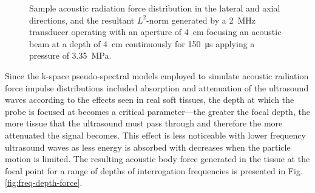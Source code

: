 \begin{figure}[!htb]
				\caption[Sample acoustic radiation force distribution]{Sample acoustic radiation force distribution in the \protect{} lateral and \protect{} axial directions, and \protect{} the resultant $L^2$-norm generated by a \SI{2}{\MHz} transducer operating with an aperture of \SI{4}{cm} focusing an acoustic beam at a depth of \SI{4}{\cm} continuously for \SI{150}{\us} applying a pressure of \SI{3.35}{\MPa}.}
				\label{fig:arfi_forces}
			\end{figure}

			Since the k-space pseudo-spectral models employed to simulate acoustic radiation force impulse distributions included absorption and attenuation of the ultrasound waves according to the effects seen in real soft tissues, the depth at which the probe is focused at becomes a critical parameter---the greater the focal depth, the more tissue that the ultrasound must pass through and therefore the more attenuated the signal becomes. This effect is less noticeable with lower frequency ultrasound waves as less energy is absorbed with decreases when the particle motion is limited. The resulting acoustic body force generated in the tissue at the focal point for a range of depths of interrogation frequencies is presented in Fig. \ref{fig:freq-depth-force}.

